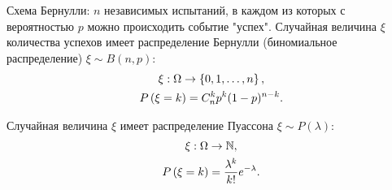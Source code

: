 Схема Бернулли: $n$ независимых испытаний, в каждом из которых с вероятностью $p$ можно происходить событие "успех"{}.
Случайная величина $\xi$ количества успехов имеет распределение Бернулли (биномиальное распределение) $\xi \sim B(n,p)$:
\begin{gather}
    \xi : \Omega \rightarrow \left \{ 0, 1, \dots, n \right \} \notag, \\
    P \left ( \xi = k \right ) = C_n^k p^k (1-p)^{n-k} .
\end{gather}

Случайная величина $\xi$ имеет распределение Пуассона $\xi \sim P(\lambda)$:
\begin{gather}
    \xi : \Omega \rightarrow \mathbb{N}, \\
    P \left ( \xi = k \right ) = \frac{\lambda^k}{k!} e^{-\lambda} .
\end{gather}

